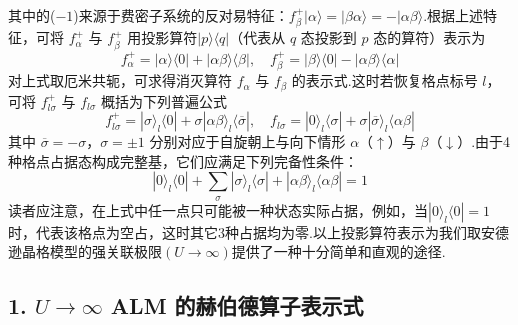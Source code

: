 其中的($-1$)来源于费密子系统的反对易特征：$f_{\beta}^{+}|\alpha\rangle=|\beta\alpha\rangle=-|\alpha\beta\rangle$.根据上述特征，可将 $f_{\alpha}^{+}$ 与 $f_{\beta}^{+}$ 用投影算符$|p\rangle\langle q|$（代表从 $q$ 态投影到 $p$ 态的算符）表示为
\begin{equation}
  f_{\alpha}^{+}=|\alpha\rangle\langle 0|+|\alpha\beta\rangle\langle\beta|,\quad
  f_{\beta}^{+}=|\beta\rangle\langle 0|-|\alpha\beta\rangle\langle\alpha|
\end{equation}
对上式取厄米共轭，可求得消灭算符 $f_{\alpha}$ 与 $f_{\beta}$ 的表示式.这时若恢复格点标号 $l$，可将 $f_{l\sigma}^{+}$ 与 $f_{l\sigma}$ 概括为下列普遍公式
\begin{equation}
  f_{l\sigma}^{+}=|\sigma\rangle_{l}\langle 0|+\sigma|\alpha\beta\rangle_{l}\langle\overline{\sigma}|,\quad
  f_{l\sigma}=|0\rangle_{l}\langle\sigma|+\sigma|\overline{\sigma}\rangle_{l}\langle\alpha\beta|
\end{equation}
其中 $\overline{\sigma}=-\sigma$，$\sigma=\pm 1$ 分别对应于自旋朝上与向下情形 $\alpha$（$\uparrow$）与 $\beta$（$\downarrow$）.由于4种格点占据态构成完整基，它们应满足下列完备性条件：
\begin{equation}
  |0\rangle_{l}\langle 0|+\sum_{\sigma}|\sigma\rangle_{l}\langle\sigma|
  +|\alpha\beta\rangle_{l}\langle\alpha\beta|=1
\end{equation}
读者应注意，在上式中任一点只可能被一种状态实际占据，例如，当$|0\rangle_{l}\langle 0|=1$时，代表该格点为空占，这时其它3种占据均为零.以上投影算符表示为我们取安德逊晶格模型的强关联极限$(U\to\infty)$提供了一种十分简单和直观的途径.

\subsection*{1. $U\to\infty$ ALM 的赫伯德算子表示式}

